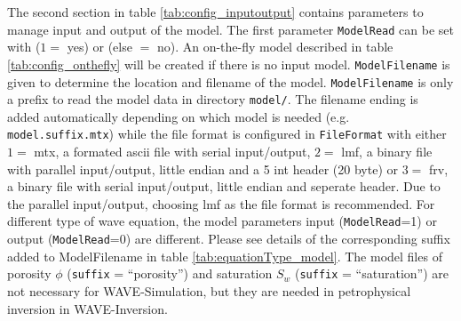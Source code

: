 \documentclass[pdftex,a4paper,parskip,listof=totoc,bibliography=totoc,onehalfspacing,12pt]{scrreprt}
\newcommand{\shellcmd}[1]{\indent\indent\texttt{#1}}	%
\begin{document}
The second section in table \ref{tab:config_inputoutput} contains parameters to manage input and output of the model. The first parameter \verb+ModelRead+ can be set with ($1=$ yes) or (else $=$ no). An on-the-fly model described in table \ref{tab:config_onthefly} will be created if there is no input model. \verb+ModelFilename+ is given to determine the location and filename of the model. \verb+ModelFilename+ is only a prefix to read the model data in directory \shellcmd{model/}. The filename ending is added automatically depending on which model is needed (e.g. \shellcmd{model.suffix.mtx}) while the file format is configured in \verb+FileFormat+ with either $1=$ mtx, a formated ascii file with serial input/output, $2=$ lmf, a binary file with parallel input/output, little endian and a 5 int header (20 byte) or $3=$ frv, a binary file with serial input/output,  little endian and seperate header. Due to the parallel input/output, choosing lmf as the file format is recommended. For different type of wave equation, the model parameters input (\verb+ModelRead+=1) or output (\verb+ModelRead+=0) are different. Please see details of the corresponding suffix added to ModelFilename in table \ref{tab:equationType_model}. The model files of porosity $\phi$ (\verb+suffix+ = ``porosity'') and saturation $S_w$ (\verb+suffix+ = ``saturation'') are not necessary for WAVE-Simulation, but they are needed in petrophysical inversion in WAVE-Inversion.
\end{document}
